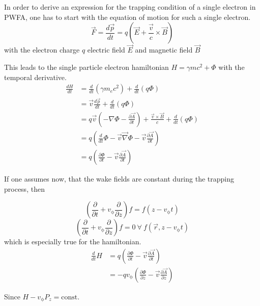 In order to derive an expression for the trapping condition of a single electron in PWFA, one has to start with the equation of motion for such a single electron. 
\begin{equation}
\vec{F}=\frac{d\vec{p}}{dt}=q(\vec{E}+\frac{\vec{v}}{c}\times\vec{B})
\end{equation}
with the electron charge $q$ electric field $\vec{E}$ and magnetic field $\vec{B}$

This leads to the single particle electron hamiltonian $ H=\gamma m c^2+\Phi$ with the temporal derivative.
\begin{align}
\frac{dH}{dt}&=\frac{d}{dt} (\gamma m_e c^2)+\frac{d}{dt}(q\Phi)\\
&=\vec{v}\frac{d\vec{p}}{dt}+\frac{d}{dt}(q\Phi)\\
&=q\vec{v}(-\nabla \Phi-\frac{\partial \vec{A}}{\partial t})+\frac{\vec{v}\times\vec{B}}{c}+\frac{d}{dt}(q\Phi)\\
&=q(\frac{d}{dt}\Phi-\vec{v}\vec{\nabla}\Phi-\vec{v}\frac{\partial \vec{A}}{\partial t})\\
&=q(\frac{\partial \Phi}{\partial t}-\vec{v}\frac{\partial \vec{A}}{\partial t})
\end{align}

If one assumes now, that the wake fields are constant during the trapping process, then 

\begin{equation}
(\frac{\partial}{\partial t}+v_\mathrm{\phi} \frac{\partial}{\partial z} ) f =   f ( z-v_\mathrm{\phi} t)
\end{equation}\begin{equation}
(\frac{\partial}{\partial t}+v_\mathrm{\phi} \frac{\partial}{\partial z} ) f =0 \ \forall \   f (\vec{r}, z-v_\mathrm{\phi} t)
\end{equation}
which is especially true for the hamiltonian.
\begin{align*}
\frac{d}{dt}H&=q(\frac{\partial \Phi}{\partial t}-\vec{v}\frac{\partial \vec{A}}{\partial t})\\
&=-q v_\mathrm{\phi}(\frac{\partial \Phi}{\partial z}-\vec{v} \frac{\partial \vec{A}}{\partial z}) 
\end{align*}

Since $H-v_\mathrm{\phi}P_z=\mathrm{const.}$

